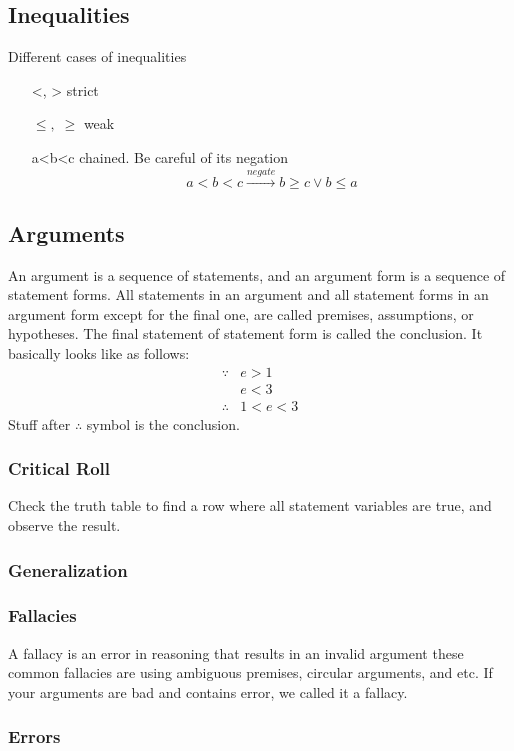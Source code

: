 \documentclass[12pt]{book}
\begin{document}
\subsection{Inequalities}
Different cases of inequalities
\begin{enumerate}
    \item[<, >] strict
    \item[$\leq,\; \geq$] weak
    \item[a<b<c] chained. Be careful of its negation
    \[
    a<b<c \xrightarrow{negate} b\geq c \vee b\leq a
    \]
\end{enumerate}

\subsection{Arguments}
An argument is a sequence of statements, and an argument form is a sequence of statement forms. All statements in an argument and all statement forms in an argument form except for the final one, are called premises, assumptions, or hypotheses. The final statement of statement form is called the conclusion. It basically looks like as follows:
\begin{align*}
    \because & e > 1\\
    & e < 3\\
    \therefore & 1<e<3
\end{align*}
Stuff after $\therefore$ symbol is the conclusion. 

\subsubsection{Critical Roll}
Check the truth table to find a row where all statement variables are true, and observe the result.
\subsubsection{Generalization}
\subsubsection{Fallacies}
A fallacy is an error in reasoning that results in an invalid argument these common fallacies are using ambiguous premises, circular arguments, and etc. If your arguments are bad and contains error, we called it a fallacy.
\subsubsection{Errors}
\end{document}
